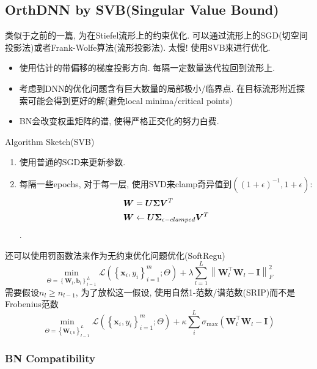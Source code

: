 \documentclass{article}
\begin{document}
\subsection{OrthDNN by SVB(Singular Value Bound)}

类似于之前的一篇, 为在Stiefel流形上的约束优化. 可以通过流形上的SGD(切空间投影法)或者Frank-Wolfe算法(流形投影法). 太慢! 使用SVB来进行优化.

\begin{itemize}
    \item 使用估计的带偏移的梯度投影方向. 每隔一定数量迭代拉回到流形上.
    \item 考虑到DNN的优化问题含有巨大数量的局部极小/临界点. 在目标流形附近探索可能会得到更好的解(避免local minima/critical points)
    \item BN会改变权重矩阵的谱, 使得严格正交化的努力白费.
\end{itemize}

Algorithm Sketch(SVB)
\begin{enumerate}
    \item 使用普通的SGD来更新参数.
    \item 每隔一些epochs, 对于每一层, 使用SVD来clamp奇异值到$((1+\epsilon)^{-1}, 1+\epsilon)$: 
    \begin{align}
        \boldsymbol{W} &= \boldsymbol{U} \bm \Sigma \boldsymbol{V}^T\\
        \boldsymbol{W}&\leftarrow \boldsymbol{U} \bm \Sigma_{\epsilon-clamped} \boldsymbol{V}^T
    \end{align}
    .
\end{enumerate} 

还可以使用罚函数法来作为无约束优化问题优化(SoftRegu)
\begin{equation}
    \min _{\Theta=\left\{\boldsymbol{W}_{l}, \boldsymbol{b}_{l}\right\}_{l=1}^{L}} \mathcal{L}\left(\left\{\boldsymbol{x}_{i}, y_{i}\right\}_{i=1}^{m} ; \Theta\right)+\lambda \sum_{l=1}^{L}\left\|\boldsymbol{W}_{l}^{\top} \boldsymbol{W}_{l}-\boldsymbol{I}\right\|_{F}^{2}
\end{equation}
需要假设$n_l \ge n_{l-1}$, 为了放松这一假设, 使用自然1-范数/谱范数(SRIP)而不是Frobenius范数
\begin{equation}
    \min _{\Theta=\left\{\boldsymbol{W}_{l, b}\right\}_{l-1}^{L}} \mathcal{L}\left(\left\{\boldsymbol{x}_{i}, y_{i}\right\}_{i=1}^{m} ; \Theta\right)+\kappa \sum_{i}^{L} \sigma_{\max }\left(\boldsymbol{W}_{l}^{\top} \boldsymbol{W}_{l}-\boldsymbol{I}\right)
\end{equation}

\subsubsection{BN Compatibility}
\end{document}
